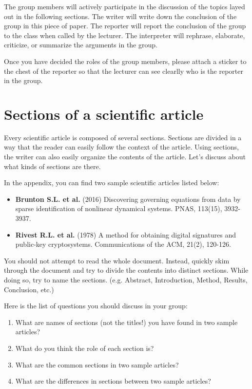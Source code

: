 \documentclass{article}
\begin{document}
The group members will actively participate in the discussion of the topics layed out in the following sections.
The writer will write down the conclusion of the group in this piece of paper.
The reporter will report the conclusion of the group to the class when called by the lecturer.
The interpreter will rephrase, elaborate, criticize, or summarize the arguments in the group.

Once you have decided the roles of the group members, please attach a sticker to the chest of the reporter so that the lecturer can see clearlly who is the reporter in the group.


\newpage
\section{Sections of a scientific article}

Every scientific article is composed of several sections.
Sections are divided in a way that the reader can easily follow the context of the article.
Using sections, the writer can also easily organize the contents of the article.
Let's discuss about what kinds of sections are there.

In the appendix, you can find two sample scientific articles listed below:
\begin{itemize}
    \item \textbf{Brunton S.L. et al.} (2016) Discovering governing equations from data by sparse identification of nonlinear dynamical systems. PNAS, 113(15), 3932-3937.
    \item \textbf{Rivest R.L. et al.} (1978) A method for obtaining digital signatures and public-key cryptosystems. Communications of the ACM, 21(2), 120-126.
\end{itemize}
You should not attempt to read the whole document.
Instead, quickly skim through the document and try to divide the contents into distinct sections.
While doing so, try to name the sections. (e.g. Abstract, Introduction, Method, Results, Conclusion, etc.) 

Here is the list of questions you should discuss in your group:
\begin{enumerate}
    \item What are names of sections (not the titles!) you have found in two sample articles? 
    \vspace{2in}
    \item What do you think the role of each section is?
    \vspace{2in}
    \item What are the common sections in two sample articles?
    \vspace{2in}
    \item What are the differences in sections between two sample articles?
    \vspace{2in}
\end{enumerate}
\end{document}
